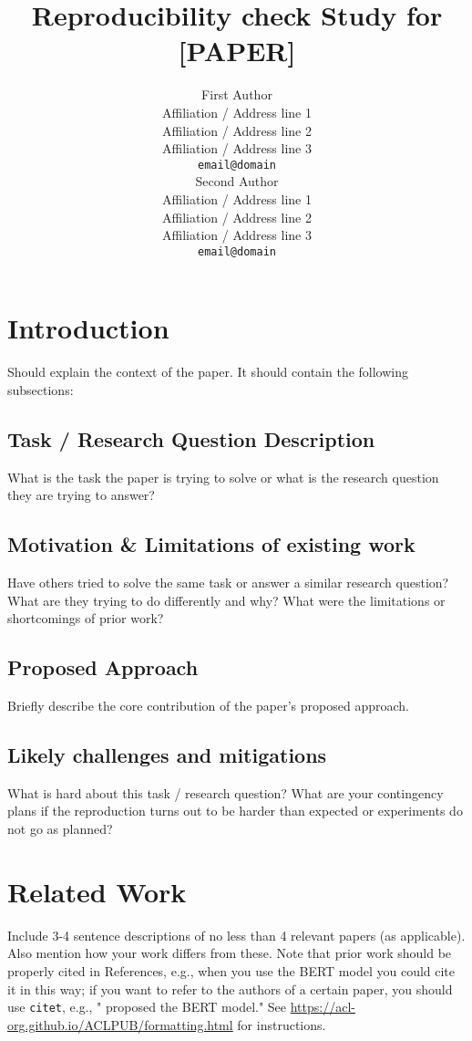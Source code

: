 \documentclass[11pt,a4paper]{article}
\title{Reproducibility check Study for [PAPER]}
\author{First Author \\
  Affiliation / Address line 1 \\
  Affiliation / Address line 2 \\
  Affiliation / Address line 3 \\
  \texttt{email@domain} \\\And
  Second Author \\
  Affiliation / Address line 1 \\
  Affiliation / Address line 2 \\
  Affiliation / Address line 3 \\
  \texttt{email@domain} \\}
\date{}
\begin{document}
\maketitle

\section{Introduction}

Should explain the context of the paper. It should contain the following subsections:

            \subsection{Task / Research Question Description} What is the task the paper is trying to solve or what is the research question they are trying to answer?
            \subsection{Motivation \& Limitations of existing work} 
            Have others tried to solve the same task or answer a similar research question? What are they trying to do differently and why? What were the limitations or shortcomings of prior work? 
            \subsection{Proposed Approach} 
            Briefly describe the core contribution of the paper's proposed approach.
            \subsection{Likely challenges and mitigations} 
            What is hard about this task / research question? What are your contingency plans if the reproduction turns out to be harder than expected or experiments do not go as planned? 


\section{Related Work}
Include 3-4 sentence descriptions of no less than 4 relevant papers (as applicable). Also mention how your work differs from these. Note that prior work should be properly cited in References, e.g., when you use the BERT model \cite{devlin2019bert} you could cite it in this way; if you want to refer to the authors of a certain paper, you should use \texttt{citet}, e.g., "\citet{devlin2019bert} proposed the BERT model." See \url{https://acl-org.github.io/ACLPUB/formatting.html} for instructions.
\end{document}
